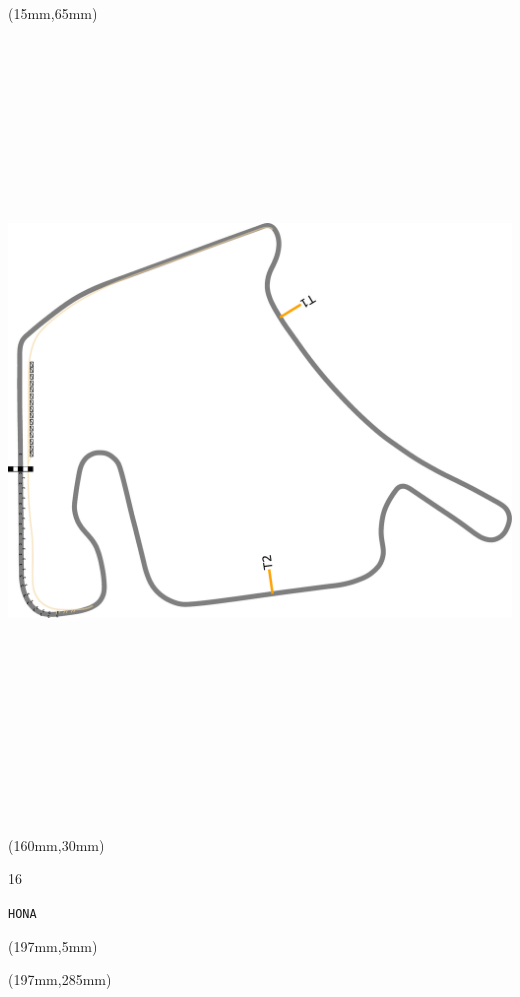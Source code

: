 \begin{textblock*}{185mm}(15mm,65mm)%
\centering
\mbox{\includegraphics[width=185mm,height=210mm,keepaspectratio]{PT/HONA.pdf}}
\end{textblock*}
\begin{textblock*}{40mm}(160mm,30mm)%
\Large
\par{} 
\par16 
\par\hfill\tiny\tt HONA\\
\end{textblock*}
\begin{textblock*}{20mm}(197mm,5mm)%
\fbox{\thepage}
\label{HONA}
\end{textblock*}
\begin{textblock*}{20mm}(197mm,285mm)%
\fbox{\thepage}
\end{textblock*}

